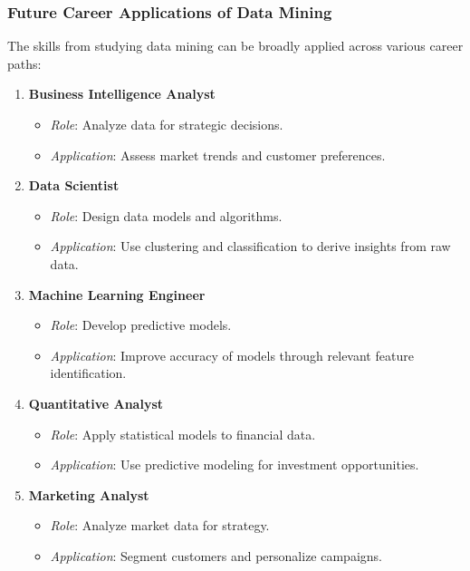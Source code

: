 \documentclass[aspectratio=169]{beamer}
\begin{document}
\begin{frame}[fragile]
    \frametitle{Future Career Applications of Data Mining}
    The skills from studying data mining can be broadly applied across various career paths:
    
    \begin{enumerate}
        \item \textbf{Business Intelligence Analyst}
            \begin{itemize}
                \item \textit{Role}: Analyze data for strategic decisions.
                \item \textit{Application}: Assess market trends and customer preferences.
            \end{itemize}
        
        \item \textbf{Data Scientist}
            \begin{itemize}
                \item \textit{Role}: Design data models and algorithms.
                \item \textit{Application}: Use clustering and classification to derive insights from raw data.
            \end{itemize}
        
        \item \textbf{Machine Learning Engineer}
            \begin{itemize}
                \item \textit{Role}: Develop predictive models.
                \item \textit{Application}: Improve accuracy of models through relevant feature identification.
            \end{itemize}
        
        \item \textbf{Quantitative Analyst}
            \begin{itemize}
                \item \textit{Role}: Apply statistical models to financial data.
                \item \textit{Application}: Use predictive modeling for investment opportunities.
            \end{itemize}
        
        \item \textbf{Marketing Analyst}
            \begin{itemize}
                \item \textit{Role}: Analyze market data for strategy.
                \item \textit{Application}: Segment customers and personalize campaigns.
            \end{itemize}
    \end{enumerate}
\end{frame}
\end{document}
